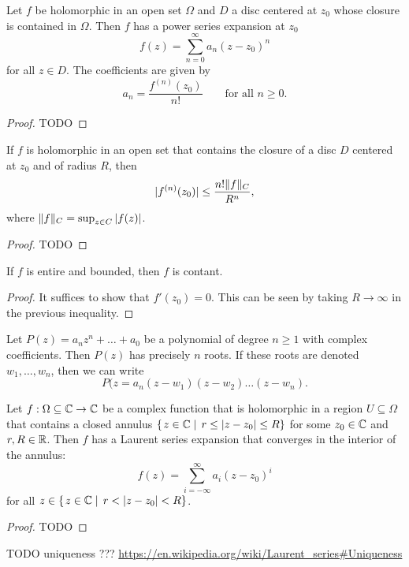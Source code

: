 \begin{proposition}
Let $f$ be holomorphic in an open set $\Omega$ and $D$ a
disc centered at $z_0$ whose closure is contained in $\Omega$. Then $f$ has a power series expansion at $z_0$
\[ f(z) = \sum_{n=0}^\infty a_n(z-z_0)^n \]
for all $z\in D$. The coefficients are given by
\[ a_n = \frac{f^{(n)}(z_0)}{n!} \qquad \text{for all $n\geq 0$}. \]
\end{proposition}
\begin{proof}
TODO
\end{proof}
\begin{corollary}
If $f$ is holomorphic in an open
set that contains the closure of a disc $D$ centered at $z_0$ and of radius $R$,
then
\[  |f^{(n)}(z_0)| \leq \frac{n!\lVert f\rVert_C}{R^n}, \]
where $\lVert f\rVert_C = \sup_{z\in C}|f(z)|$.
\end{corollary}
\begin{proof}
TODO
\end{proof}
\begin{corollary}
If $f$ is entire and bounded, then $f$ is contant.
\end{corollary}
\begin{proof}
It suffices to show that $f'(z_0) = 0$. This can be seen by taking $R\to\infty$ in the previous inequality.
\end{proof}
\begin{corollary}
Let $P(z) = a_nz^n + \ldots + a_0$ be a polynomial of degree $n\geq 1$ with complex coefficients. Then $P(z)$ has precisely $n$ roots. If these roots are denoted $w_1, \ldots, w_n$, then we can write
\[ P(z = a_n(z-w_1)(z-w_2)\ldots(z-w_n). \]
\end{corollary}

\begin{proposition}
Let $f: \Omega\subseteq \mathbb{C}\to \mathbb{C}$ be a complex function that is holomorphic in a region $U\subseteq \Omega$ that contains a closed annulus $\left\{\left. z\in \mathbb{C} \;\right|\; r\leq|z-z_0|\leq R \right\}$ for some $z_0\in \mathbb{C}$ and $r,R\in \mathbb{R}$. Then $f$ has a Laurent series expansion that converges in the interior of the annulus:
\[ f(z) = \sum_{i=-\infty}^\infty a_i(z-z_0)^i \]
for all $z\in \left\{\left. z\in \mathbb{C} \;\right|\; r < |z-z_0| < R \right\}$.
\end{proposition}
\begin{proof}
TODO
\end{proof}
TODO uniqueness ??? \url{https://en.wikipedia.org/wiki/Laurent_series#Uniqueness}

